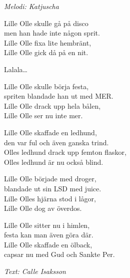 {\footnotesize\textit{Melodi: Katjuscha}}\par
\vspace{10pt}
Lille Olle skulle gå på disco\\
men han hade inte någon sprit.\\
Lille Olle fixa lite hembränt,\\
Lille Olle gick då på en nit.\par
\vspace{10pt}
Lalala…\par
\vspace{10pt}
Lille Olle skulle börja festa,\\
spriten blandade han ut med MER.\\
Lille Olle drack upp hela bålen,\\
Lille Olle ser nu inte mer.\par
\vspace{10pt}
Lille Olle skaffade en ledhund,\\
den var ful och även ganska trind.\\
Olles ledhund drack upp femton flaskor,\\
Olles ledhund är nu också blind.\par
\vspace{10pt}
Lille Olle började med droger,\\
blandade ut sin LSD med juice.\\
Lille Olles hjärna stod i lågor,\\
Lille Olle dog av överdos.\par
\vspace{10pt}
Lille Olle sitter nu i himlen,\\
festa kan man även göra där.\\
Lille Olle skaffade en ölback,\\
capsar nu med Gud och Sankte Per.\par
\vspace{10pt}
{\footnotesize\textit{Text: Calle Isaksson}}

